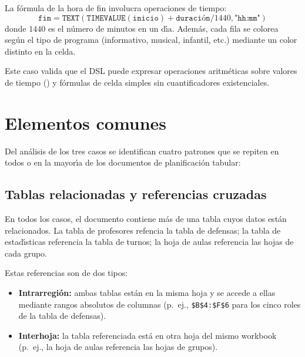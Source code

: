 La f\'ormula de la hora de fin involucra operaciones de tiempo:
\[
\texttt{fin} = \texttt{TEXT}(\texttt{TIMEVALUE}(\texttt{inicio}) + \texttt{duraci\'on}/1440, \texttt{"hh:mm"})
\]
donde $1440$ es el n\'umero de minutos en un d\'{\i}a.  Adem\'as, cada fila
se colorea seg\'un el tipo de programa (informativo, musical, infantil, etc.)
mediante un color distinto en la celda.

Este caso valida que el DSL puede expresar operaciones aritm\'eticas sobre
valores de tiempo () y f\'ormulas de celda simples sin
cuantificadores existenciales.

\section{Elementos comunes}
\label{sec:elementos-comunes}

Del an\'alisis de los tres casos se identifican cuatro patrones que se
repiten en todos o en la mayor\'{\i}a de los documentos de planificaci\'on
tabular:

\subsection{Tablas relacionadas y referencias cruzadas}
\label{ssec:elem-tablas}

En todos los casos, el documento contiene m\'as de una tabla cuyos datos est\'an
relacionados.  La tabla de profesores refencia la tabla de defensas; la tabla
de estad\'{\i}sticas referencia la tabla de turnos; la hoja de aulas referencia
las hojas de cada grupo.

Estas referencias son de dos tipos:
\begin{itemize}
  \item \textbf{Intrarregi\'on:} ambas tablas est\'an en la misma hoja y
    se accede a ellas mediante rangos absolutos de columnas (p.~ej.,
    \texttt{\$B\$4:\$F\$6} para los cinco roles de la tabla de defensas).
  \item \textbf{Interhoja:} la tabla referenciada est\'a en otra hoja del
    mismo workbook (p.~ej., la hoja de aulas referencia las hojas de grupos).
\end{itemize}

